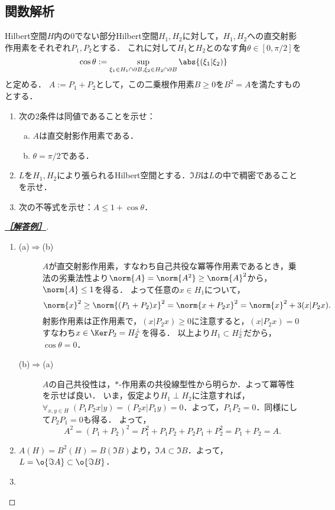 \documentclass[uplatex,dvipdfmx]{jsarticle}
\begin{document}
\subsection{関数解析}

\begin{tcolorbox}[colframe=ForestGreen, colback=ForestGreen!10!white,breakable,colbacktitle=ForestGreen!40!white,coltitle=black,fonttitle=\bfseries\sffamily,
    title=B 第11問（関数解析）]
    Hilbert空間$H$内の$0$でない部分Hilbert空間$H_1,H_2$に対して，$H_1,H_2$への直交射影作用素をそれぞれ$P_1,P_2$とする．
    これに対して$H_1$と$H_2$とのなす角$\theta\in[0,\pi/2]$を
    \[\cos\theta:=\sup_{\xi_1\in H_1\cap\partial B,\xi_2\in H_2\cap\partial B}\abs{(\xi_1|\xi_2)}\]
    と定める．
    $A:=P_1+P_2$として，この二乗根作用素$B\ge0$を$B^2=A$を満たすものとする．
    \begin{enumerate}
        \item 次の2条件は同値であることを示せ：
        \begin{enumerate}[(a)]
            \item $A$は直交射影作用素である．
            \item $\theta=\pi/2$である．
        \end{enumerate}
        \item $L$を$H_1,H_2$により張られるHilbert空間とする．$\Im B$は$L$の中で稠密であることを示せ．
        \item 次の不等式を示せ：$A\le 1+\cos\theta$．
    \end{enumerate}
\end{tcolorbox}
\begin{proof}[\textbf{\underline{［解答例］}}]\mbox{}
    \begin{enumerate}
        \item \begin{description}
            \item[(a)$\Rightarrow$(b)] $A$が直交射影作用素，すなわち自己共役な冪等作用素であるとき，乗法の劣乗法性より$\norm{A}=\norm{A^2}\ge\norm{A}^2$から，$\norm{A}\le1$を得る．
            よって任意の$x\in H_1$について，
            \[\norm{x}^2\ge\norm{(P_1+P_2)x}^2=\norm{x+P_2x}^2=\norm{x}^2+3(x|P_2x).\]
            射影作用素は正作用素で，$(x|P_2x)\ge0$に注意すると，$(x|P_2x)=0$すなわち$x\in\Ker P_2=H_2^\perp$を得る．
            以上より$H_1\subset H_2^\perp$だから，$\cos\theta=0$．
            \item[(b)$\Rightarrow$(a)] $A$の自己共役性は，$*$-作用素の共役線型性から明らか．よって冪等性を示せば良い．
            いま，仮定より$H_1\perp H_2$に注意すれば，$\forall_{x,y\in H}\;(P_1P_2x|y)=(P_2x|P_1y)=0$．よって，$P_1P_2=0$．同様にして$P_2P_1=0$も得る．
            よって，
            \[A^2=(P_1+P_2)^2=P_1^2+P_1P_2+P_2P_1+P_2^2=P_1+P_2=A.\]
        \end{description}
        \item $A(H)=B^2(H)=B(\Im B)$より，$\Im A\subset\Im B$．よって，$L=\o{\Im A}\subset\o{\Im B}$．
        \item 
    \end{enumerate}
\end{proof}
\end{document}
